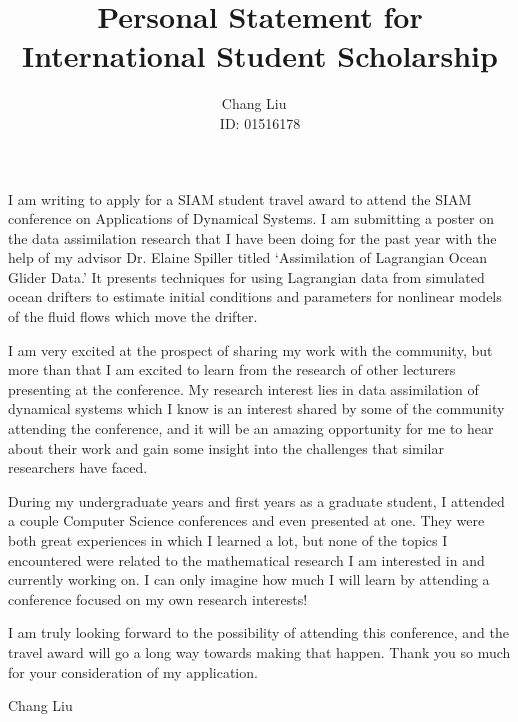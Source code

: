 \documentclass[12pt]{article}
\begin{document}
\title{Personal Statement for International Student Scholarship}
\author{Chang Liu ~\\ ID: 01516178}{}{}
\maketitle
\thispagestyle{empty}



I am writing to apply for a SIAM student travel award to attend the SIAM
conference on Applications of Dynamical Systems. 
I am submitting a poster on the data assimilation research that I have been
doing for the past year with the help of my advisor Dr. Elaine Spiller
titled `Assimilation of Lagrangian Ocean Glider Data.' 
It presents
techniques for using Lagrangian data from simulated ocean drifters to estimate
initial conditions and parameters for nonlinear models of the fluid flows which
move the drifter.

I am very excited at the prospect of sharing my work with the community, but
more than that I am excited to learn from the research of other lecturers
presenting at the conference. 
My research interest lies in data assimilation of dynamical systems which I
know is an interest shared by some of the community attending the conference,
and it will be an amazing opportunity for me to hear about their work and gain
some insight into the challenges that similar researchers have faced. 

During my undergraduate years and first years as a graduate student, I attended
a couple Computer Science conferences and even presented at one.
They were both great experiences in which I learned a lot, but none of the
topics I encountered were related to the mathematical research I am
interested in and currently working on.
I can only imagine how much I will learn by attending a conference focused on
my own research interests!

I am truly looking forward to the possibility of attending this conference,
and the travel award will go a long way towards making that happen.
Thank you so much for your consideration of my application.

\bigskip
\bigskip
Chang Liu
\end{document}
